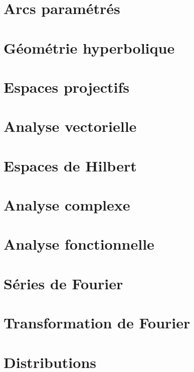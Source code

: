 \documentclass[a4paper,twoside,11pt]{book}
\begin{document}
\chapter{Arcs paramétrés}




\chapter{Géométrie hyperbolique}


\chapter{Espaces projectifs}




\chapter{Analyse vectorielle}


\chapter{Espaces de Hilbert}


\chapter{Analyse complexe}          \label{ChapICHIooXbLccl}



\chapter{Analyse fonctionnelle}



\chapter{Séries de Fourier}


\chapter{Transformation de Fourier}


\chapter{Distributions}

\end{document}
